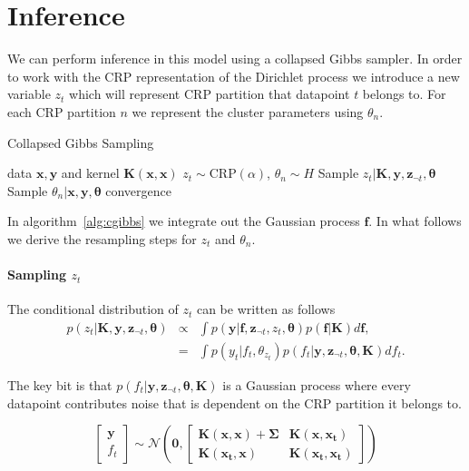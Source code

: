 \documentclass{article}
\begin{document}
\section{Inference}
\label{inference}

We can perform inference in this model using a collapsed Gibbs sampler. In order to work with the CRP representation of the Dirichlet process we introduce a new variable $z_t$ which will represent CRP partition that datapoint $t$ belongs to. For each CRP partition $n$ we represent the cluster parameters using $\theta_n$.

\begin{algorithm}[tb]
   \caption{Collapsed Gibbs Sampling}
   \label{alg:cgibbs}
\begin{algorithmic}
    data $\bm{x}, \bm{y}$ and kernel $\bm{K}(\bm{x},\bm{x})$
    $z_t \sim \textrm{CRP}(\alpha)$, $\theta_n \sim H$
   \REPEAT
   \STATE Sample $z_t | \bm{K}, \bm{y}, \bm{z}_{\lnot t}, \bm{\theta}$
   \STATE Sample $\theta_n | \bm{x}, \bm{y}, \bm{\theta}$
   \UNTIL convergence
\end{algorithmic}
\end{algorithm}

In algorithm~\ref{alg:cgibbs} we integrate out the Gaussian process $\bm{f}$. In what follows we derive the resampling steps for $z_t$ and $\theta_n$.

\paragraph{Sampling $z_t$} The conditional distribution of $z_t$ can be written as follows
\begin{eqnarray*}
p(z_t | \bm{K}, \bm{y}, \bm{z}_{\lnot t}, \bm{\theta}) & \propto & \int p(\bm{y} | \bm{f}, \bm{z}_{\lnot t}, z_t, \bm{\theta} ) p(\bm{f} | \bm{K}) d \bm{f}, \\
 & = & \int p(y_t | f_t, \theta_{z_t} ) p(f_t | \bm{y}, \bm{z}_{\lnot t}, \bm{\theta}, \bm{K}) df_t.
\end{eqnarray*}

The key bit is that $p(f_t | \bm{y}, \bm{z}_{\lnot t}, \bm{\theta}, \bm{K})$ is a Gaussian process where every datapoint contributes noise that is dependent on the CRP partition it belongs to.

\begin{equation}
\begin{bmatrix}
\bm{y} \\ f_t
\end{bmatrix}
\sim \mathcal{N}\left(\bm{0},
\begin{bmatrix}
\bm{K}(\bm{x}, \bm{x}) + \bm{\Sigma}& \bm{K}(\bm{x},\bm{x_t}) \\
\bm{K}(\bm{x_t}, \bm{x}) & \bm{K}(\bm{x_t},\bm{x_t})
\end{bmatrix}
\right)
\end{equation}
\end{document}
